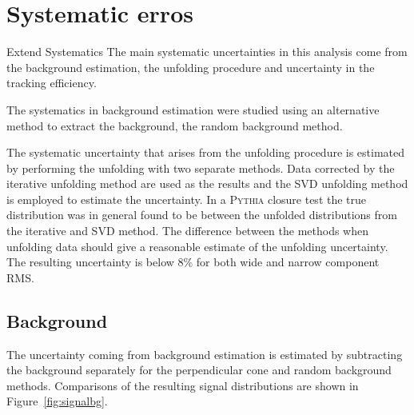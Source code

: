 \section{Systematic erros}
{\color{red} Extend Systematics}
\label{sec:systematicerrors}
The main systematic uncertainties in this analysis come from the background estimation, the unfolding procedure and uncertainty in the tracking efficiency. 


The systematics in background estimation were studied using an alternative method to extract the background, the random background method. %

The systematic uncertainty that arises from the unfolding procedure is estimated by performing the unfolding with two separate methods. Data corrected by the iterative unfolding method are used as the results and the SVD unfolding method is employed to estimate the uncertainty. In a \textsc{Pythia} closure test the true distribution was in general found to be between the unfolded distributions from the iterative and SVD method. The difference between the methods when unfolding data should give a reasonable estimate of the unfolding uncertainty. The resulting uncertainty is below 8\% for both wide and narrow component RMS.



  
 \subsection{Background}
The uncertainty coming from background estimation is estimated by subtracting the background separately for the perpendicular cone and random background methods. Comparisons of the resulting signal distributions are shown in Figure~\ref{fig:signalbg}. 
 
